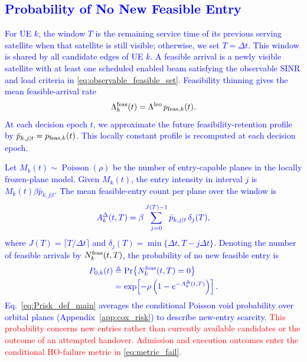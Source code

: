\documentclass[10pt,letterpaper,journal]{IEEEtran}
\newcommand{\revnew}[1]{\textcolor{red}{#1}}
\begin{document}
\subsection{\textcolor{blue}{Probability of No New Feasible Entry}}
\label{subsec:cox_main}

\textcolor{blue}{For UE $k$, the window $T$ is the remaining service time of its previous serving satellite when that satellite is still visible; otherwise, we set $T=\Delta t$.
This window is shared by all candidate edges of UE $k$.
A feasible arrival is a newly visible satellite with at least one scheduled enabled beam satisfying the observable SINR and load criteria in \eqref{eq:observable_feasible_set}.
Feasibility thinning gives the mean feasible-arrival rate}
\begin{equation}
\Lambda_k^{\rm feas}(t)=\Lambda^{\rm leo}\,p_{{\rm feas},k}(t).
\label{eq:Lambda_feas_main}
\end{equation}
\textcolor{blue}{At each decision epoch $t$, we approximate the future feasibility-retention profile by $\bar p_{k,j|t}=p_{{\rm feas},k}(t)$.
This locally constant profile is recomputed at each decision epoch.}

\textcolor{blue}{Let $M_k(t)\sim\operatorname{Poisson}(\rho)$ be the number of entry-capable planes in the locally frozen-plane model.
Given $M_k(t)$, the entry intensity in interval $j$ is $M_k(t)\beta\bar p_{k,j|t}$.
The mean feasible-entry count per plane over the window is}
\begin{equation}
\textcolor{blue}{
A_k^\Delta(t,T)
=\beta\sum_{j=0}^{J(T)-1}\bar p_{k,j|t}\,\delta_j(T),}    
\end{equation}
\textcolor{blue}{where $J(T)=\lceil T/\Delta t\rceil$ and $\delta_j(T)=\min\{\Delta t,T-j\Delta t\}$.
Denoting the number of feasible arrivals by $N_k^{\rm feas}(t,T)$, the probability of no new feasible entry is}
\begin{equation}
\textcolor{blue}{
\begin{aligned}
P_{0,k}(t)
&\triangleq\Pr\!\left\{N_k^{\rm feas}(t,T)=0\right\}\\
&=\exp\!\left[-\rho\left(1-e^{-A_k^\Delta(t,T)}\right)\right].
\end{aligned}}
\label{eq:Prisk_def_main}
\end{equation}
\textcolor{blue}{Eq.~\eqref{eq:Prisk_def_main} averages the conditional Poisson void probability over orbital planes (Appendix~\ref{app:cox_risk}) to describe new-entry scarcity.}
\revnew{This probability concerns new entries rather than currently available candidates or the outcome of an attempted handover. Admission and execution outcomes enter the conditional HO-failure metric in \eqref{eq:metric_fail}.}
\end{document}
